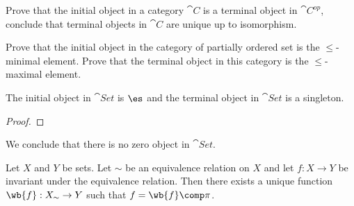 \documentclass[10pt]{article}
\begin{document}
\begin{center}
\end{center}
\begin{problem}
    Prove that the initial object in a category $\cat{C}$ is a terminal object in $\cat{{C}^{op}}$, conclude that terminal objects in $\cat{C}$ are unique up to isomorphism.
\end{problem}
\begin{problem}
    Prove that the initial object in the category of partially ordered set is the $\le$-minimal element. Prove that the terminal object in this category is the $\le$-maximal element.
\end{problem}
\begin{proposition}
    The initial object in $\cat{Set}$ is $\es$ and the terminal object in $\cat{Set}$ is a singleton.
\end{proposition}
\begin{proof}
    
\end{proof}
\par
We conclude that there is no zero object in $\cat{Set}$.
\begin{Universal property for quotient sets}
    Let $X$ and $Y$ be sets. Let $\sim$ be an equivalence relation on $X$ and let $f:X\to Y$ be invariant under the equivalence relation. Then there exists a unique function $\wb{f}:{X}_{\sim}\to Y$ such that $f=\wb{f}\comp\pi$.
\end{Universal property for quotient sets}
\begin{center}
\end{center}
\par
\end{document}
